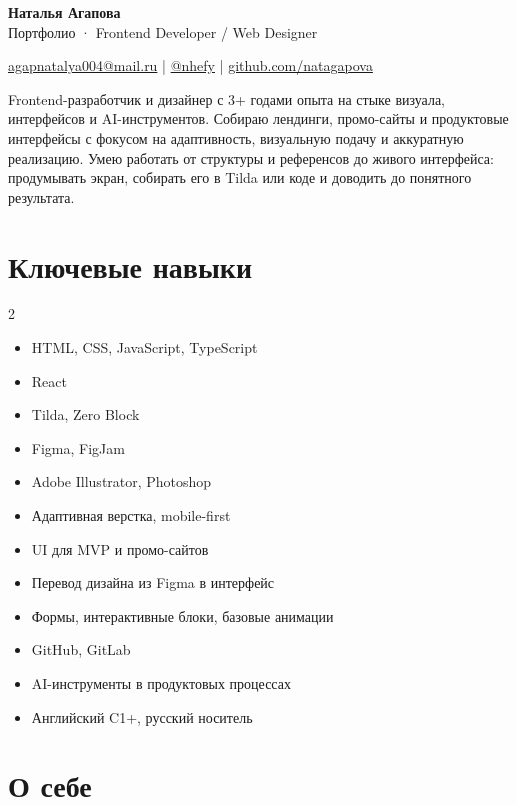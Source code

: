 \documentclass[11pt,a4paper]{article}
\begin{document}
{\fontsize{24}{28}\selectfont\textbf{Наталья Агапова}}\\[0.2em]
{\large Портфолио · Frontend Developer / Web Designer}

\vspace{0.4em}

\href{mailto:agapnatalya004@mail.ru}{agapnatalya004@mail.ru}
\quad|\quad
\href{https://t.me/nhefy}{@nhefy}
\quad|\quad
\href{https://github.com/natagapova}{github.com/natagapova}

\vspace{0.8em}

\textcolor{textgray}{
Frontend-разработчик и дизайнер с 3+ годами опыта на стыке визуала, интерфейсов и AI-инструментов. Собираю лендинги, промо-сайты и продуктовые интерфейсы с фокусом на адаптивность, визуальную подачу и аккуратную реализацию. Умею работать от структуры и референсов до живого интерфейса: продумывать экран, собирать его в Tilda или коде и доводить до понятного результата.
}

\section*{Ключевые навыки}

\begin{multicols}{2}
\begin{itemize}
  \item HTML, CSS, JavaScript, TypeScript
  \item React
  \item Tilda, Zero Block
  \item Figma, FigJam
  \item Adobe Illustrator, Photoshop
  \item Адаптивная верстка, mobile-first
  \item UI для MVP и промо-сайтов
  \item Перевод дизайна из Figma в интерфейс
  \item Формы, интерактивные блоки, базовые анимации
  \item GitHub, GitLab
  \item AI-инструменты в продуктовых процессах
  \item Английский C1+, русский носитель
\end{itemize}
\end{multicols}

\section*{О себе}
\end{document}
